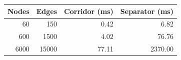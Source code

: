 \begin{tabular}{rrrr}
\hline
Nodes & Edges & Corridor (ms) & Separator (ms) \\
\hline
60 & 150 & 0.42 & 6.82 \\
600 & 1500 & 4.02 & 76.76 \\
6000 & 15000 & 77.11 & 2370.00 \\
\hline
\end{tabular}
